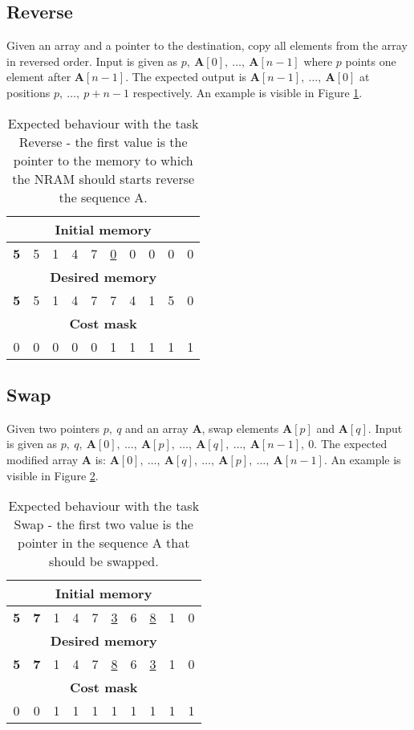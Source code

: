 \subsection{Reverse}
Given an array and a pointer to the destination, copy all elements from the array in reversed order. Input is given as $p,\ \textbf{A}[0],\ \dots,\ \textbf{A}[n-1]$ where $p$ points one element after $\textbf{A}[n-1]$. The expected output is $\textbf{A}[n-1],\ \dots,\ \textbf{A}[0]$ at positions $p,\ \dots,\ p+n-1$ respectively. An example is visible in Figure \ref{fig:reverse-example}.
\begin{table}[h!]
	\centering
	\begin{tabular}{|c|c|c|c|c|c|c|c|c|c|}
		\hline
		\multicolumn{10}{|c|}{\textbf{Initial memory}} \\ \hline
		\textbf{5} & 5 & 1 & 4 & 7 & \underline{0} & 0 & 0 & 0 & 0 \\ \hline\hline\hline
		\multicolumn{10}{|c|}{\textbf{Desired memory}} \\ \hline
		\textbf{5} & 5 & 1 & 4 & 7 & 7 & 4 & 1 & 5 & 0 \\ \hline\hline\hline
		\multicolumn{10}{|c|}{\textbf{Cost mask}} \\ \hline
		0 & 0 & 0 & 0 & 0 & 1 & 1 & 1 & 1 & 1 \\ \hline
	\end{tabular}
	\caption{Expected behaviour with the task Reverse - the first value is the pointer to the memory to which the NRAM should starts reverse the sequence A.}
	\label{fig:reverse-example}
\end{table}
\FloatBarrier
\subsection{Swap}
Given two pointers $p,\ q$ and an array \textbf{A}, swap elements $\textbf{A}[p]$ and $\textbf{A}[q]$. Input is given as $p,\ q,\ \textbf{A}[0],\ \dots,\ \textbf{A}[p],\ \dots,\ \textbf{A}[q],\ \dots,\ \textbf{A}[n-1],\ 0$. The expected modified array \textbf{A} is: $\textbf{A}[0],\ \dots,\ \textbf{A}[q],\ \dots,\ \textbf{A}[p],\ \dots,\ \textbf{A}[n-1]$. An example is visible in Figure \ref{fig:swap-example}.
\begin{table}[h!]
	\centering
	\begin{tabular}{|c|c|c|c|c|c|c|c|c|c|}
		\hline
		\multicolumn{10}{|c|}{\textbf{Initial memory}} \\ \hline
		\textbf{5} & \textbf{7} & 1 & 4 & 7 & \underline{3} & 6 & \underline{8} & 1 & 0 \\ \hline\hline\hline
		\multicolumn{10}{|c|}{\textbf{Desired memory}} \\ \hline
		\textbf{5} & \textbf{7} & 1 & 4 & 7 & \underline{8} & 6 & \underline{3} & 1 & 0 \\ \hline\hline\hline
		\multicolumn{10}{|c|}{\textbf{Cost mask}} \\ \hline
		0 & 0 & 1 & 1 & 1 & 1 & 1 & 1 & 1 & 1 \\ \hline
	\end{tabular}
	\caption{Expected behaviour with the task Swap - the first two value is the pointer in the sequence A that should be swapped.}
	\label{fig:swap-example}
\end{table}
\FloatBarrier

